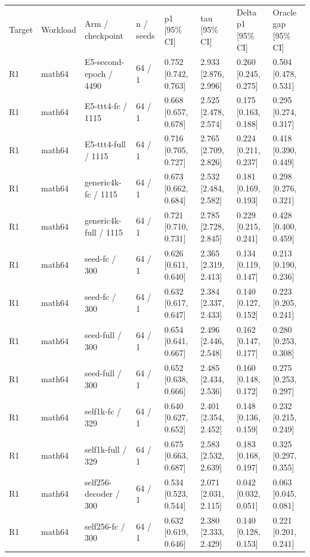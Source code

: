 \begin{tabular}{llllllll}
\hline
Target & Workload & Arm / checkpoint & n / seeds & p1 [95\% CI] & tau [95\% CI] & Delta p1 [95\% CI] & Oracle gap [95\% CI] \\
R1 & math64 & E5-second-epoch / 4490 & 64 / 1 & 0.752 [0.742, 0.763] & 2.933 [2.876, 2.996] & 0.260 [0.245, 0.275] & 0.504 [0.478, 0.531] \\
R1 & math64 & E5-ttt4-fc / 1115 & 64 / 1 & 0.668 [0.657, 0.678] & 2.525 [2.478, 2.574] & 0.175 [0.163, 0.188] & 0.295 [0.274, 0.317] \\
R1 & math64 & E5-ttt4-full / 1115 & 64 / 1 & 0.716 [0.705, 0.727] & 2.765 [2.709, 2.826] & 0.224 [0.211, 0.237] & 0.418 [0.390, 0.449] \\
R1 & math64 & generic4k-fc / 1115 & 64 / 1 & 0.673 [0.662, 0.684] & 2.532 [2.484, 2.582] & 0.181 [0.169, 0.193] & 0.298 [0.276, 0.321] \\
R1 & math64 & generic4k-full / 1115 & 64 / 1 & 0.721 [0.710, 0.731] & 2.785 [2.728, 2.845] & 0.229 [0.215, 0.241] & 0.428 [0.400, 0.459] \\
R1 & math64 & seed-fc / 300 & 64 / 1 & 0.626 [0.611, 0.640] & 2.365 [2.319, 2.413] & 0.134 [0.119, 0.147] & 0.213 [0.190, 0.236] \\
R1 & math64 & seed-fc / 300 & 64 / 1 & 0.632 [0.617, 0.647] & 2.384 [2.337, 2.433] & 0.140 [0.127, 0.152] & 0.223 [0.205, 0.241] \\
R1 & math64 & seed-full / 300 & 64 / 1 & 0.654 [0.641, 0.667] & 2.496 [2.446, 2.548] & 0.162 [0.147, 0.177] & 0.280 [0.253, 0.308] \\
R1 & math64 & seed-full / 300 & 64 / 1 & 0.652 [0.638, 0.666] & 2.485 [2.434, 2.536] & 0.160 [0.148, 0.172] & 0.275 [0.253, 0.297] \\
R1 & math64 & self1k-fc / 329 & 64 / 1 & 0.640 [0.627, 0.652] & 2.401 [2.354, 2.452] & 0.148 [0.136, 0.159] & 0.232 [0.215, 0.249] \\
R1 & math64 & self1k-full / 329 & 64 / 1 & 0.675 [0.663, 0.687] & 2.583 [2.532, 2.639] & 0.183 [0.168, 0.197] & 0.325 [0.297, 0.355] \\
R1 & math64 & self256-decoder / 300 & 64 / 1 & 0.534 [0.523, 0.544] & 2.071 [2.031, 2.115] & 0.042 [0.032, 0.051] & 0.063 [0.045, 0.081] \\
R1 & math64 & self256-fc / 300 & 64 / 1 & 0.632 [0.619, 0.646] & 2.380 [2.333, 2.429] & 0.140 [0.128, 0.153] & 0.221 [0.201, 0.241] \\

\end{tabular}
